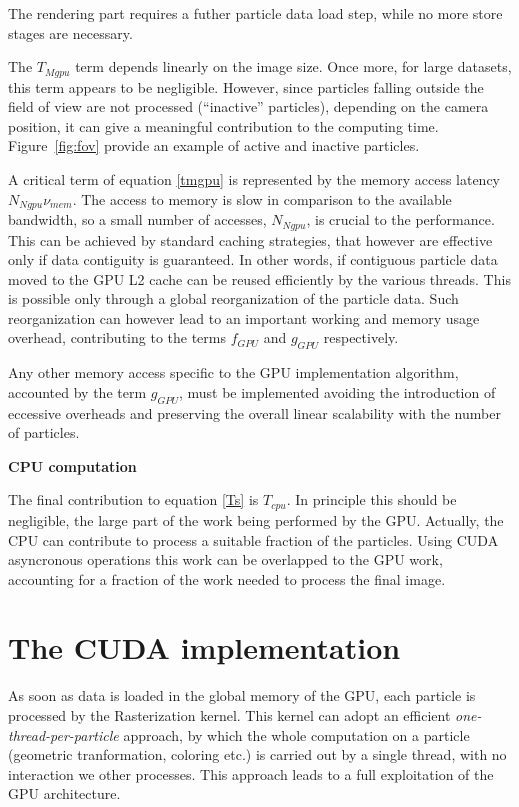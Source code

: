 \documentclass[11pt]{article}
\begin{document}
The rendering part requires a futher particle data load step, while no more store 
stages are necessary.

The $T_{Mgpu}$ term depends linearly on the image size. Once more, 
for large datasets, this term appears to be negligible. However, since
particles falling outside the field of view are not processed (``inactive'' particles),
depending on the camera position, it can give a meaningful contribution to
the computing time. Figure~\ref{fig:fov} provide an example of active and inactive particles.

A critical term of equation \eqref{tmgpu} is represented by the memory access
latency $N_{Ngpu} \nu_{mem}$. The access to memory is slow in comparison to
the available bandwidth, so a small number of accesses, $N_{Ngpu}$, is crucial
to the performance. This can be achieved by standard caching strategies, that
however are effective only if data contiguity is guaranteed. In other words,
if contiguous particle data moved to the GPU L2 cache can be reused efficiently
by the various threads. This is possible only through a global reorganization 
of the particle data. Such reorganization can however lead to an important
working and memory usage overhead, contributing to the terms $f_{GPU}$ and
$g_{GPU}$ respectively. 

Any other memory access specific to the GPU implementation algorithm,
accounted by the term $g_{GPU}$, must be implemented 
avoiding the introduction of eccessive overheads and preserving the overall
linear scalability with the number of particles.

\medskip
\noindent
{\bf CPU computation}

The final contribution to equation \eqref{Ts} is $T_{cpu}$. In principle this should be negligible, 
the large part of the work being performed by the GPU. Actually, the CPU
can contribute to process a suitable fraction of the particles. Using
CUDA asyncronous operations this work can be overlapped 
to the GPU work, accounting for a fraction of the work needed to 
process the final image.

\section{The CUDA implementation}
\label{sec:implementation}

As soon as data is loaded in the global memory of the GPU, each particle is processed 
by the Rasterization kernel. This kernel can adopt an efficient  
{\it one-thread-per-particle} approach, by which the whole computation on 
a particle (geometric tranformation, coloring etc.) is carried out
by a single thread, with no interaction we other processes.  
This approach leads to a full exploitation of the GPU architecture. 
\end{document}
